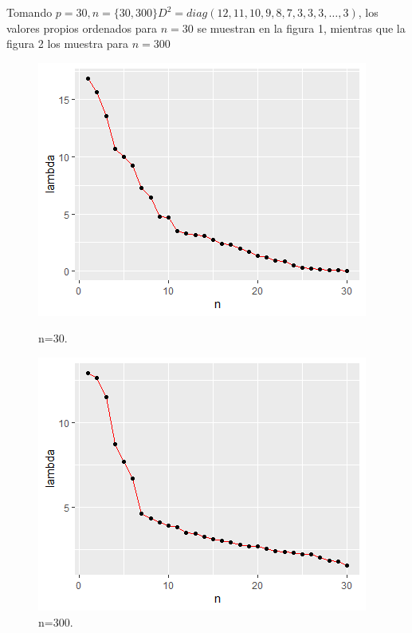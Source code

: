 \documentclass[paper=letter, fontsize=14pt]{scrartcl}
\numberwithin{equation}{section} %
\numberwithin{figure}{section} %
\numberwithin{table}{section} %
\begin{document}
Tomando $p=30,n=\lbrace 30,300\rbrace D^2=diag(12,11,10,9,8,7,3,3,3,\hdots ,3)$, los valores propios ordenados para $n=30$ se muestran en la figura 1, mientras que la figura 2 los muestra para $n=300$\\

\begin{figure}[h]
  \centering
  \begin{minipage}[b]{0.4\textwidth}
    \includegraphics[width=\textwidth]{i1.png}
    \caption{n=30.}
  \end{minipage}
  \hfill
  \begin{minipage}[b]{0.4\textwidth}
    \includegraphics[width=\textwidth]{i2.png}
    \caption{n=300.}
  \end{minipage}
\end{figure}
\end{document}
